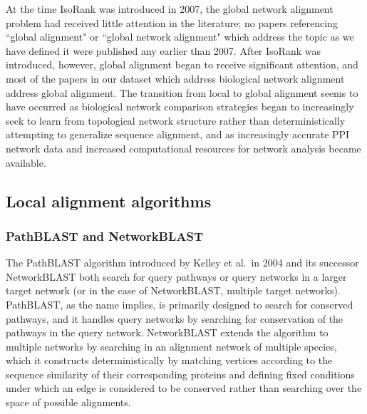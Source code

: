 \documentclass[12pt]{thesis}
\theoremstyle{plain}
\theoremstyle{definition}
\theoremstyle{remark}
\begin{document}
At the time IsoRank \cite{Singh_2007} was introduced in 2007, the global network alignment problem had received little attention in the literature; no papers referencing ``global alignment" or ``global network alignment" which address the topic as we have defined it were published any earlier than 2007. After IsoRank was introduced, however, global alignment began to receive significant attention, and most of the papers in our dataset which address biological network alignment address global alignment. The transition from local to global alignment seems to have occurred as biological network comparison strategies began to increasingly seek to learn from topological network structure rather than deterministically attempting to generalize sequence alignment, and as increasingly accurate PPI network data and increased computational resources for network analysis became available.

\subsection{Local alignment algorithms}

\subsubsection{PathBLAST and NetworkBLAST} The PathBLAST algorithm introduced by Kelley et al.\ in 2004 \cite{kelley2004pathblast, Sharan_2005, Sharan_2006} and its successor NetworkBLAST \cite{kalaev2008networkblast} both search for query pathways or query networks in a larger target network (or in the case of NetworkBLAST, multiple target networks). PathBLAST, as the name implies, is primarily designed to search for conserved pathways, and it handles query networks by searching for conservation of the pathways in the query network. NetworkBLAST extends the algorithm to multiple networks by searching in an alignment network of multiple species, which it constructs deterministically by matching vertices according to the sequence similarity of their corresponding proteins and defining fixed conditions under which an edge is considered to be conserved rather than searching over the space of possible alignments.
\end{document}
